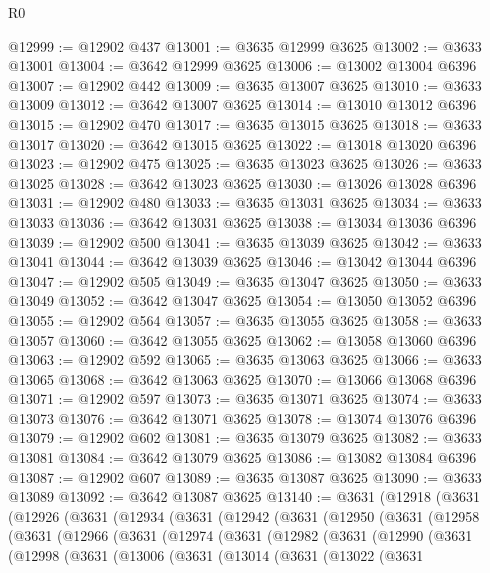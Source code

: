 \begin{lexlean}{R0}
\begin{coremodule}
@12999 := @12902 @437
@13001 := @3635 @12999 @3625
@13002 := @3633 @13001
@13004 := @3642 @12999 @3625
@13006 := @13002 @13004 @6396
@13007 := @12902 @442
@13009 := @3635 @13007 @3625
@13010 := @3633 @13009
@13012 := @3642 @13007 @3625
@13014 := @13010 @13012 @6396
@13015 := @12902 @470
@13017 := @3635 @13015 @3625
@13018 := @3633 @13017
@13020 := @3642 @13015 @3625
@13022 := @13018 @13020 @6396
@13023 := @12902 @475
@13025 := @3635 @13023 @3625
@13026 := @3633 @13025
@13028 := @3642 @13023 @3625
@13030 := @13026 @13028 @6396
@13031 := @12902 @480
@13033 := @3635 @13031 @3625
@13034 := @3633 @13033
@13036 := @3642 @13031 @3625
@13038 := @13034 @13036 @6396
@13039 := @12902 @500
@13041 := @3635 @13039 @3625
@13042 := @3633 @13041
@13044 := @3642 @13039 @3625
@13046 := @13042 @13044 @6396
@13047 := @12902 @505
@13049 := @3635 @13047 @3625
@13050 := @3633 @13049
@13052 := @3642 @13047 @3625
@13054 := @13050 @13052 @6396
@13055 := @12902 @564
@13057 := @3635 @13055 @3625
@13058 := @3633 @13057
@13060 := @3642 @13055 @3625
@13062 := @13058 @13060 @6396
@13063 := @12902 @592
@13065 := @3635 @13063 @3625
@13066 := @3633 @13065
@13068 := @3642 @13063 @3625
@13070 := @13066 @13068 @6396
@13071 := @12902 @597
@13073 := @3635 @13071 @3625
@13074 := @3633 @13073
@13076 := @3642 @13071 @3625
@13078 := @13074 @13076 @6396
@13079 := @12902 @602
@13081 := @3635 @13079 @3625
@13082 := @3633 @13081
@13084 := @3642 @13079 @3625
@13086 := @13082 @13084 @6396
@13087 := @12902 @607
@13089 := @3635 @13087 @3625
@13090 := @3633 @13089
@13092 := @3642 @13087 @3625
@13140 := @3631
    (@12918
      (@3631
        (@12926
          (@3631
            (@12934
              (@3631
                (@12942
                  (@3631
                    (@12950
                      (@3631
                        (@12958
                          (@3631
                            (@12966
                              (@3631
                                (@12974
                                  (@3631
                                    (@12982
                                      (@3631
                                        (@12990
                                          (@3631
                                            (@12998
                                              (@3631
                                                (@13006
                                                  (@3631
                                                    (@13014
                                                      (@3631
                                                        (@13022
                                                          (@3631

\end{coremodule}
\end{lexlean}
